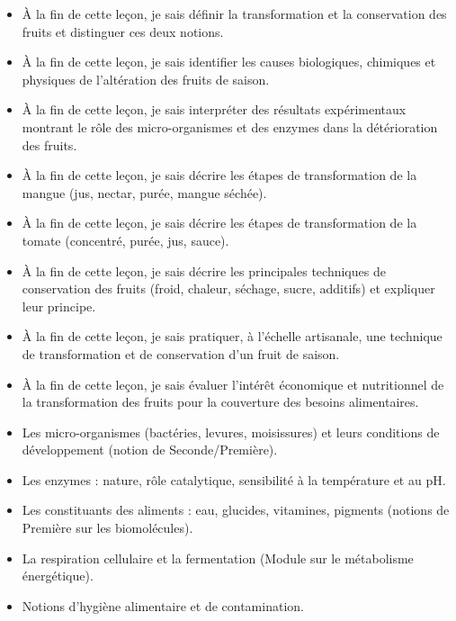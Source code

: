 \documentclass[11pt]{article}
\begin{document}
\begin{objectifs}
\begin{itemize}
\item À la fin de cette leçon, je sais définir la transformation et la conservation des fruits et distinguer ces deux notions.
\item À la fin de cette leçon, je sais identifier les causes biologiques, chimiques et physiques de l'altération des fruits de saison.
\item À la fin de cette leçon, je sais interpréter des résultats expérimentaux montrant le rôle des micro-organismes et des enzymes dans la détérioration des fruits.
\item À la fin de cette leçon, je sais décrire les étapes de transformation de la mangue (jus, nectar, purée, mangue séchée).
\item À la fin de cette leçon, je sais décrire les étapes de transformation de la tomate (concentré, purée, jus, sauce).
\item À la fin de cette leçon, je sais décrire les principales techniques de conservation des fruits (froid, chaleur, séchage, sucre, additifs) et expliquer leur principe.
\item À la fin de cette leçon, je sais pratiquer, à l'échelle artisanale, une technique de transformation et de conservation d'un fruit de saison.
\item À la fin de cette leçon, je sais évaluer l'intérêt économique et nutritionnel de la transformation des fruits pour la couverture des besoins alimentaires.
\end{itemize}
\end{objectifs}

\begin{prerequis}
\begin{itemize}
\item Les micro-organismes (bactéries, levures, moisissures) et leurs conditions de développement (notion de Seconde/Première).
\item Les enzymes : nature, rôle catalytique, sensibilité à la température et au pH.
\item Les constituants des aliments : eau, glucides, vitamines, pigments (notions de Première sur les biomolécules).
\item La respiration cellulaire et la fermentation (Module sur le métabolisme énergétique).
\item Notions d'hygiène alimentaire et de contamination.
\end{itemize}
\end{prerequis}
\end{document}
